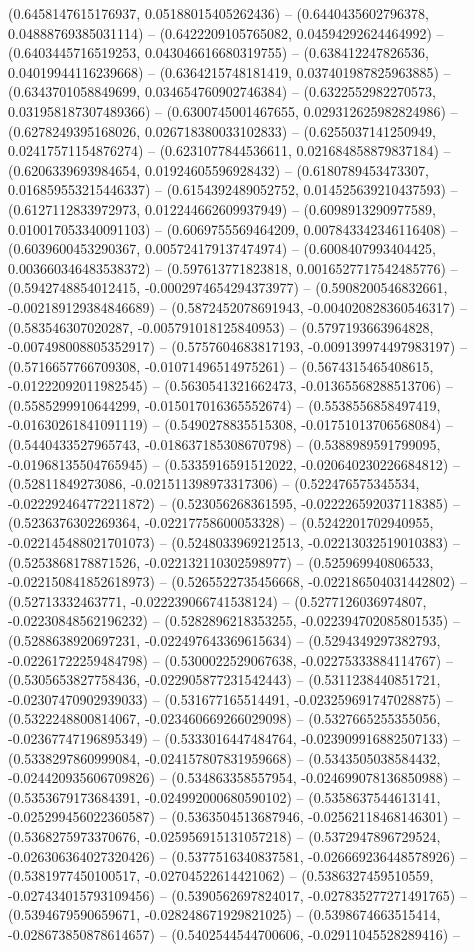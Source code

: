 (0.6458147615176937, 0.05188015405262436) -- (0.6440435602796378, 0.04888769385031114) -- (0.6422209105765082, 0.04594292624464992) -- (0.6403445716519253, 0.043046616680319755) -- (0.638412247826536, 0.04019944116239668) -- (0.6364215748181419, 0.037401987825963885) -- (0.6343701058849699, 0.034654760902746384) -- (0.6322552982270573, 0.031958187307489366) -- (0.6300745001467655, 0.029312625982824986) -- (0.6278249395168026, 0.026718380033102833) -- (0.6255037141250949, 0.02417571154876274) -- (0.6231077844536611, 0.021684858879837184) -- (0.6206339693984654, 0.01924605596928432) -- (0.6180789453473307, 0.016859553215446337) -- (0.6154392489052752, 0.014525639210437593) -- (0.6127112833972973, 0.012244662609937949) -- (0.6098913290977589, 0.010017053340091103) -- (0.6069755569464209, 0.007843342346116408) -- (0.6039600453290367, 0.005724179137474974) -- (0.6008407993404425, 0.003660346483538372) -- (0.597613771823818, 0.0016527717542485776) -- (0.5942748854012415, -0.0002974654294373977) -- (0.5908200546832661, -0.002189129384846689) -- (0.5872452078691943, -0.004020828360546317) -- (0.583546307020287, -0.005791018125840953) -- (0.5797193663964828, -0.007498008805352917) -- (0.5757604683817193, -0.009139974497983197) -- (0.5716657766709308, -0.01071496514975261) -- (0.5674315465408615, -0.01222092011982545) -- (0.5630541321662473, -0.01365568288513706) -- (0.5585299910644299, -0.015017016365552674) -- (0.5538556858497419, -0.01630261841091119) -- (0.5490278835515308, -0.01751013706568084) -- (0.5440433527965743, -0.018637185308670798) -- (0.5388989591799095, -0.01968135504765945) -- (0.5335916591512022, -0.020640230226684812) -- (0.52811849273086, -0.021511398973317306) -- (0.522476575345534, -0.022292464772211872) -- (0.523056268361595, -0.022226592037118385) -- (0.5236376302269364, -0.02217758600053328) -- (0.5242201702940955, -0.022145488021701073) -- (0.5248033969212513, -0.02213032519010383) -- (0.5253868178871526, -0.022132110302598977) -- (0.525969940806533, -0.022150841852618973) -- (0.5265522735456668, -0.022186504031442802) -- (0.52713332463771, -0.022239066741538124) -- (0.5277126036974807, -0.02230848562196232) -- (0.5282896218353255, -0.022394702085801535) -- (0.5288638920697231, -0.022497643369615634) -- (0.5294349297382793, -0.02261722259484798) -- (0.5300022529067638, -0.02275333884114767) -- (0.5305653827758436, -0.022905877231542443) -- (0.5311238440851721, -0.02307470902939033) -- (0.531677165514491, -0.023259691747028875) -- (0.5322248800814067, -0.023460669266029098) -- (0.5327665255355056, -0.02367747196895349) -- (0.5333016447484764, -0.023909916882507133) -- (0.5338297860999084, -0.024157807831959668) -- (0.5343505038584432, -0.024420935606709826) -- (0.534863358557954, -0.024699078136850988) -- (0.5353679173684391, -0.024992000680590102) -- (0.5358637544613141, -0.025299456022360587) -- (0.5363504513687946, -0.02562118468146301) -- (0.5368275973370676, -0.025956915131057218) -- (0.5372947896729524, -0.026306364027320426) -- (0.5377516340837581, -0.026669236448578926) -- (0.5381977450100517, -0.02704522614421062) -- (0.5386327459510559, -0.027434015793109456) -- (0.5390562697824017, -0.027835277271491765) -- (0.5394679590659671, -0.028248671929821025) -- (0.5398674663515414, -0.028673850878614657) -- (0.5402544544700606, -0.02911045528289416) -- 